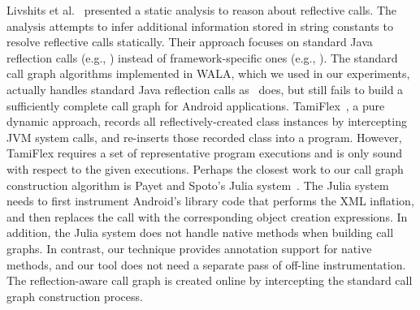 Livshits et al.~\cite{Livshits:2005} presented a static analysis
to reason about reflective calls. The analysis
attempts to infer additional information stored in string constants to resolve
reflective calls statically. Their approach focuses on standard Java
reflection calls (e.g., ) instead of
framework-specific ones (e.g., ).
The standard call graph algorithms implemented in WALA, which we used
in our experiments, actually handles standard Java
reflection calls as~\cite{Livshits:2005} does, but still fails to build
a sufficiently complete call graph for
Android applications. TamiFlex~\cite{Bodden:2011}, a pure dynamic
approach, records all reflectively-created class instances
by intercepting JVM system calls, and re-inserts those recorded 
class into a program. However, TamiFlex requires a set of representative
program executions and is only sound with respect to the given executions.
Perhaps the closest work to our call graph
construction algorithm is Payet and Spoto's Julia
system~\cite{Payet:2011:SAA:2032266.2032299}. The Julia system
needs to first instrument Android's library code that performs the XML inflation,
and then replaces the  call with the corresponding
object creation expressions. In addition, the Julia system does not handle
native methods when building call graphs. In contrast, our technique provides
annotation support for native methods, and our tool does not need a separate
pass of off-line instrumentation. The reflection-aware call graph is created
online by intercepting the standard call graph construction process.







 
